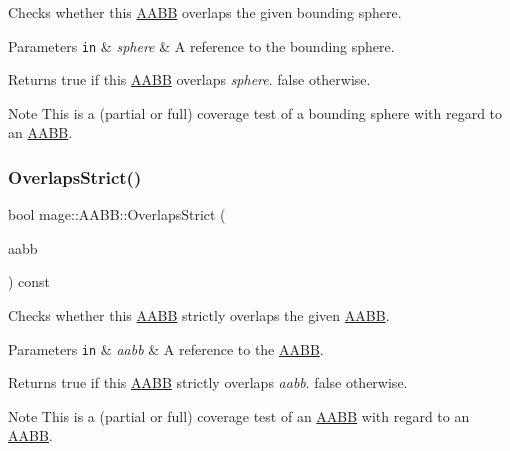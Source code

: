 Checks whether this \hyperlink{classmage_1_1_a_a_b_b}{A\+A\+BB} overlaps the given bounding sphere.


\begin{DoxyParams}[1]{Parameters}
\mbox{\tt in}  & {\em sphere} & A reference to the bounding sphere. \\
\hline
\end{DoxyParams}
\begin{DoxyReturn}{Returns}
{\ttfamily true} if this \hyperlink{classmage_1_1_a_a_b_b}{A\+A\+BB} overlaps {\itshape sphere}. {\ttfamily false} otherwise. 
\end{DoxyReturn}
\begin{DoxyNote}{Note}
This is a (partial or full) coverage test of a bounding sphere with regard to an \hyperlink{classmage_1_1_a_a_b_b}{A\+A\+BB}. 
\end{DoxyNote}
\hypertarget{classmage_1_1_a_a_b_b_a00628d5ed2bf73021bbb3cdf94049580}{}\label{classmage_1_1_a_a_b_b_a00628d5ed2bf73021bbb3cdf94049580} 
\subsubsection{\texorpdfstring{Overlaps\+Strict()}{OverlapsStrict()}\hspace{0.1cm}{\footnotesize\ttfamily [1/2]}}
{\footnotesize\ttfamily bool mage\+::\+A\+A\+B\+B\+::\+Overlaps\+Strict (\begin{DoxyParamCaption}\item[{const \hyperlink{classmage_1_1_a_a_b_b}{A\+A\+BB} \&}]{aabb }\end{DoxyParamCaption}) const\hspace{0.3cm}{\ttfamily [noexcept]}}

Checks whether this \hyperlink{classmage_1_1_a_a_b_b}{A\+A\+BB} strictly overlaps the given \hyperlink{classmage_1_1_a_a_b_b}{A\+A\+BB}.


\begin{DoxyParams}[1]{Parameters}
\mbox{\tt in}  & {\em aabb} & A reference to the \hyperlink{classmage_1_1_a_a_b_b}{A\+A\+BB}. \\
\hline
\end{DoxyParams}
\begin{DoxyReturn}{Returns}
{\ttfamily true} if this \hyperlink{classmage_1_1_a_a_b_b}{A\+A\+BB} strictly overlaps {\itshape aabb}. {\ttfamily false} otherwise. 
\end{DoxyReturn}
\begin{DoxyNote}{Note}
This is a (partial or full) coverage test of an \hyperlink{classmage_1_1_a_a_b_b}{A\+A\+BB} with regard to an \hyperlink{classmage_1_1_a_a_b_b}{A\+A\+BB}. 
\end{DoxyNote}
\hypertarget{classmage_1_1_a_a_b_b_af5e8507258d4990abec9f6261449c6a9}{}\label{classmage_1_1_a_a_b_b_af5e8507258d4990abec9f6261449c6a9} 
